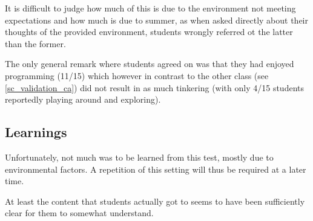 It is difficult to judge how much of this is due to the environment not meeting expectations and how much is due to summer, as when asked directly about their thoughts of the provided environment, students wrongly referred ot the latter than the former.

The only general remark where students agreed on was that they had enjoyed programming (11/15) which however in contrast to the other class (see \ref{sc_validation_ca}) did not result in as much tinkering (with only 4/15 students reportedly playing around and exploring).


\subsection{Learnings}

Unfortunately, not much was to be learned from this test, mostly due to environmental factors. A repetition of this setting will thus be required at a later time.

At least the content that students actually got to seems to have been sufficiently clear for them to somewhat understand.
